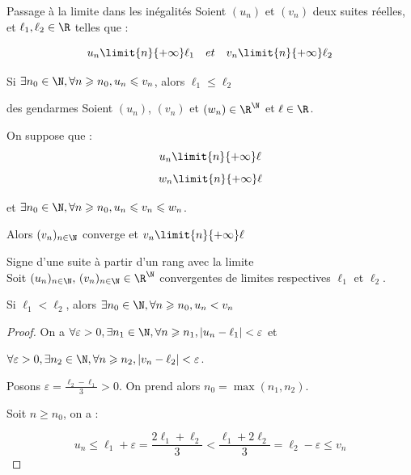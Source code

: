 \begin{theoreme}{Passage à la limite dans les inégalités}{}
    Soient $(u_n)$ et $(v_n)$ deux suites réelles, et $\ell_1, \ell_2 \in \R$ telles que :

    \[ u_n \limit{n}{+\infty} \ell_1 \quad et \quad v_n \limit{n}{+\infty} \ell_2 \]

    Si $\exists n_0 \in \N, \forall n \geqslant n_0, u_n \leqslant v_n$, alors $\ell_1 \leqslant \ell_2$
\end{theoreme}

\begin{theoreme}{des gendarmes}{}
    Soient $(u_n)$, $(v_n)$ et $(w_n) \in \R^{\N}$ et $\ell \in \R$. 
    
    On suppose que : 
    $$u_n \limit{n}{+\infty} \ell$$
    $$w_n \limit{n}{+\infty} \ell$$

    et $\exists n_0 \in \N, \forall n \geqslant n_0, u_n \leqslant v_n \leqslant w_n$. 

    Alors $(v_n)_{n \in \N}$ converge et $v_n \limit{n}{+\infty} \ell$
    
\end{theoreme}

\begin{theorement}{Signe d'une suite à partir d'un rang avec la limite}{}
    \\Soit $(u_n)_{n \in \N}, \, (v_n)_{n \in \N} \in \R^{\N}$ convergentes de limites 
    respectives $\ell_1$ et $\ell_2$.

    Si $\ell_1 < \ell_2$, alors $\exists n_0 \in \N, \forall n \geqslant n_0, u_n < v_n$
\end{theorement}


\begin{proof}
    On a $\forall \varepsilon > 0, \exists n_1 \in \N, \forall n \geqslant n_1, |u_n - \ell_1| < \varepsilon$ et

    $\forall \varepsilon > 0, \exists n_2 \in \N, \forall n \geqslant n_2, |v_n - \ell_2| < \varepsilon$.

    Posons $\displaystyle \varepsilon = \frac{\ell_2 - \ell_1} 3 > 0$. On prend alors 
    $n_0 = \max(n_1, n_2)$.

    Soit $n \geqslant n_0$, on a :

    $$ u_n \leqslant \ell_1 + \varepsilon = \frac{2\ell_1 + \ell_2} 3 < \frac{\ell_1 + 2\ell_2}{3} = \ell_2 - \varepsilon \leqslant v_n$$

\end{proof}

